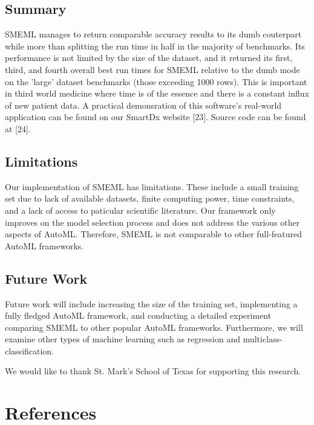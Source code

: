 \documentclass{article}
\begin{document}
\subsection{Summary}
SMEML manages to return comparable accuracy results to its dumb couterpart while more than splitting the run time in half in the majority of benchmarks. Its performance is not limited by the size of the dataset, and it returned its first, third, and fourth overall best run times for SMEML relative to the dumb mode on the 'large' dataset benchmarks (those exceeding 1000 rows). This is important in third world medicine where time is of the essence and there is a constant influx of new patient data. A practical demonsration of this software's real-world application can be found on our SmartDx website [23]. Source code can be found at [24].
\subsection{Limitations}
Our implementation of SMEML has limitations. These include a small training set due to lack of available datasets, finite computing power, time constraints, and a lack of access to paticular scientific literature. Our framework only improves on the model selection process and does not address the various other aspects of AutoML. Therefore, SMEML is not comparable to other full-featured AutoML frameworks.
\subsection{Future Work}
Future work will include increasing the size of the training set, implementing a fully fledged AutoML framework, and conducting a detailed experiment comparing SMEML to other popular AutoML frameworks. Furthermore, we will examine other types of machine learning such as regression and multiclass-classification.

\begin{ack}
We would like to thank St. Mark's School of Texas for supporting this research.
\end{ack}

\section*{References}
\end{document}
